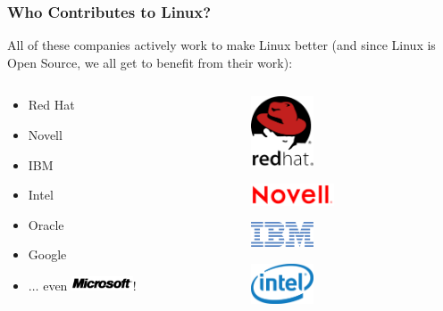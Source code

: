 \documentclass{beamer}
\begin{document}
\begin{frame}
  \frametitle{Who Contributes to Linux?}
  All of these companies actively work to make Linux better (and since Linux is Open Source, we all get to benefit from their work):
  \begin{columns}
    
    \begin{Large}
      \begin{itemize}
      \item Red Hat
      \item Novell
      \item IBM
      \item Intel
      \item Oracle
      \item Google
      \item $\ldots$
        even \includegraphics[width=0.3\textwidth]{../img/microsoft}!
      \end{itemize}
    \end{Large}

    \begin{center}
      \includegraphics[width=0.3\textwidth]{../img/redhat}

      \includegraphics[width=0.4\textwidth]{../img/novell}

      \includegraphics[width=0.3\textwidth]{../img/ibm}

      \includegraphics[width=0.3\textwidth]{../img/intel}


\end{center}
\end{columns}
\end{frame}
\end{document}
